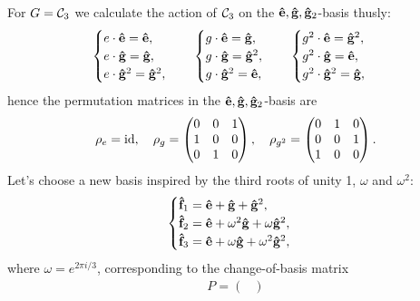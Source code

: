	\begin{example}\label{example:regCyc3}
		For $G = \mathcal{C}_3$ we calculate the action of $\mathcal{C}_3$ on the $\mathbf{\hat{e}}, \mathbf{\hat{g}}, \mathbf{\hat{g}}_2$-basis thusly:
		\begin{align*}
			\begin{cases}
				e \cdot \mathbf{\hat{e}} = \mathbf{\hat{e}}, \\
				e \cdot \mathbf{\hat{g}} = \mathbf{\hat{g}}, \\
				e \cdot \mathbf{\hat{g}}^2 = \mathbf{\hat{g}}^2,
			\end{cases} \quad \begin{cases}
				g \cdot \mathbf{\hat{e}} = \mathbf{\hat{g}}, \\
				g \cdot \mathbf{\hat{g}} = \mathbf{\hat{g}}^2, \\
				g \cdot \mathbf{\hat{g}}^2 = \mathbf{\hat{e}},
			\end{cases} \quad \begin{cases}
			g^2 \cdot \mathbf{\hat{e}} = \mathbf{\hat{g}}^2, \\
			g^2 \cdot \mathbf{\hat{g}} = \mathbf{\hat{e}}, \\
			g^2 \cdot \mathbf{\hat{g}}^2 = \mathbf{\hat{g}},
			\end{cases}
		\end{align*}
		hence the permutation matrices in the $\mathbf{\hat{e}}, \mathbf{\hat{g}}, \mathbf{\hat{g}}_2$-basis are
		\begin{align*}
			\rho_e = \text{id}, \quad \rho_g = \begin{pmatrix}
				0&0&1 \\ 1&0&0 \\ 0&1&0
			\end{pmatrix}, \quad \rho_{g^2} = \begin{pmatrix}
			0&1&0 \\ 0&0&1 \\ 1&0&0 
			\end{pmatrix}.
		\end{align*}
		Let's choose a new basis inspired by the third roots of unity 1, $\omega$ and $\omega^2$:
		\begin{align*}
			\begin{cases}
				\mathbf{\hat{f}}_1 = \mathbf{\hat{e}} + \mathbf{\hat{g}} + \mathbf{\hat{g}}^2, \\
				\mathbf{\hat{f}}_2 = \mathbf{\hat{e}} + \omega^2\mathbf{\hat{g}} + \omega\mathbf{\hat{g}}^2, \\
				\mathbf{\hat{f}}_3 = \mathbf{\hat{e}} + \omega\mathbf{\hat{g}} + \omega^2\mathbf{\hat{g}}^2,
			\end{cases}
		\end{align*}
		where $\omega = e^{2 \pi i/3}$, corresponding to the change-of-basis matrix 
		\begin{align*}
			P = \begin{pmatrix}

\end{pmatrix}
\end{align*}
\end{example}
